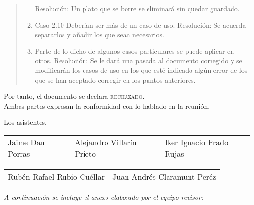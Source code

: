 \documentclass[11pt, a4paper, twoside]{report}
\begin{document}
\begin{quotation}
\begin{enumerate}
			Resolución: Un plato que se borre se eliminará sin quedar guardado.
				\item Caso 2.10 Deberían ser más de un caso de uso.
			Resolución: Se acuerda separarlos y añadir los que sean necesarios.
				\item Parte de lo dicho de algunos casos particulares se puede aplicar en otros.
			Resolución: Se le dará una pasada al documento corregido y se modificarán los casos de uso en los que esté indicado algún error de los que se han aceptado corregir en los puntos anteriores.
			\end{enumerate}

	\end{quotation}

	\noindent
	Por tanto, el documento se declara \textsc{rechazado}.\\
	Ambas partes expresan la conformidad con lo hablado en la reunión.

\vspace{2cm}

\raggedright
Los asistentes,

\vspace{2.5cm}

	\begin{tabu} to \linewidth {X[1,c] X[1, c] X[1, c]}
		Jaime Dan Porras & Alejandro Villarín Prieto & Iker Ignacio Prado Rujas
	\end{tabu}

	\vfill

	\begin{tabu} to \linewidth {X[1,c] X[1, c]}
		Rubén Rafael Rubio Cuéllar & Juan Andrés Claramunt Peréz
	\end{tabu}
	
	\vfill

	{\itshape A continuación se incluye el anexo elaborado por el equipo revisor: }

	
\end{document}
